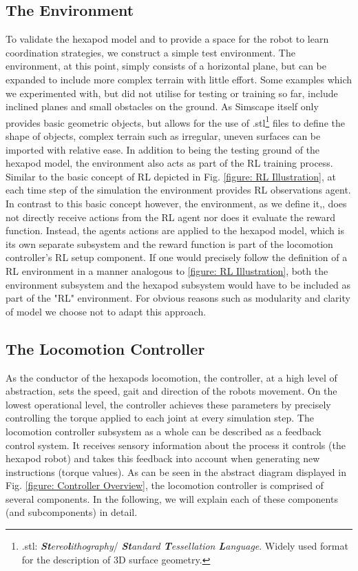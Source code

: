 \subsection{The Environment}
To validate the hexapod model and to provide a space for the robot to learn coordination strategies, we construct a simple test environment.
The environment, at this point, simply consists of a horizontal plane, but can be expanded to include more complex terrain with little effort.
Some examples which we experimented with, but did not utilise for testing or training so far, include inclined planes and small obstacles on the ground.
As Simscape itself only provides basic geometric objects, but allows for the use of .stl\footnote{.stl: \emph{\textbf{St}ereo\textbf{l}ithography}/ \emph{\textbf{St}andard \textbf{T}essellation \textbf{L}anguage}.  Widely used format for the description of 3D surface geometry.} files to define the shape of objects, complex terrain such as irregular, uneven surfaces can be imported with relative ease.
In addition to being the testing ground of the hexapod model, the environment also acts as part of the RL training process.
Similar to the basic concept of RL depicted in Fig. \ref{figure: RL Illustration}, at each time step of the simulation the environment provides RL observations agent. 
In contrast to this basic concept however, the environment, as we define it,, does not directly receive actions from the RL agent nor does it evaluate the reward function.
Instead, the agents actions are applied to the hexapod model, which is its own separate subsystem and the reward function is part of the locomotion controller's RL setup component.
If one would precisely follow the definition of a RL environment in a manner analogous to \ref{figure: RL Illustration}, both the environment subsystem and the hexapod subsystem would have to be included as part of the "RL" environment.
For obvious reasons such as modularity and clarity of model we choose not to adapt this approach.

\subsection{The Locomotion Controller} \label{subsec: Locomotion controller}
As the conductor of the hexapods locomotion, the controller, at a high level of abstraction, sets the speed, gait and direction of the robots movement.
On the lowest operational level, the controller achieves these parameters by precisely controlling the torque applied to each joint at every simulation step.
The locomotion controller subsystem as a whole can be described as a feedback control system.
It receives sensory information about the process it controls (the hexapod robot) and takes this feedback into account when generating new instructions (torque values).
As can be seen in the abstract diagram displayed in Fig. \ref{figure: Controller Overview}, the locomotion controller is comprised of several components. 
In the following, we will explain each of these components (and subcomponents) in detail.

